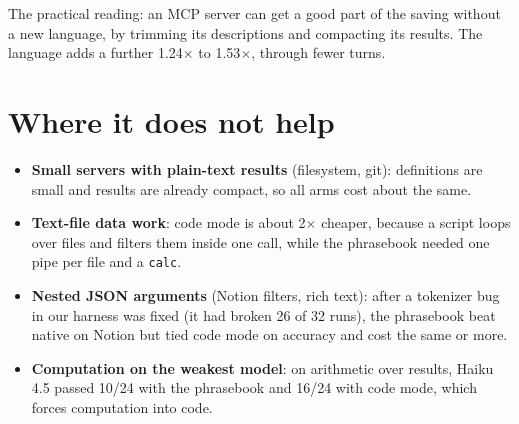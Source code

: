 \documentclass[11pt]{article}
\begin{document}
The practical reading: an MCP server can get a good part of the saving without a new language, by trimming its descriptions and compacting its results. The language adds a further 1.24$\times$ to 1.53$\times$, through fewer turns.

\section{Where it does not help}
\label{sec:limits}
\begin{itemize}
  \item \textbf{Small servers with plain-text results} (filesystem, git): definitions are small and results are already compact, so all arms cost about the same.
  \item \textbf{Text-file data work}: code mode is about 2$\times$ cheaper, because a script loops over files and filters them inside one call, while the phrasebook needed one pipe per file and a \texttt{calc}.
  \item \textbf{Nested JSON arguments} (Notion filters, rich text): after a tokenizer bug in our harness was fixed (it had broken 26 of 32 runs), the phrasebook beat native on Notion but tied code mode on accuracy and cost the same or more.
  \item \textbf{Computation on the weakest model}: on arithmetic over results, Haiku 4.5 passed 10/24 with the phrasebook and 16/24 with code mode, which forces computation into code.
\end{itemize}
\end{document}
